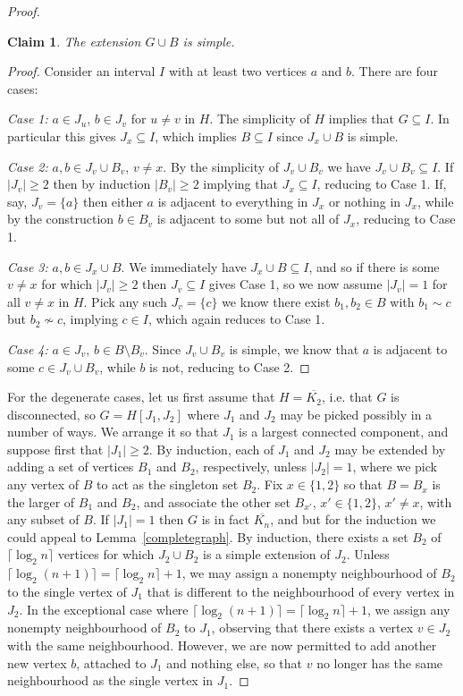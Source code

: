 \documentclass[11pt]{article}
\newtheorem*{claim}{Claim}
\begin{document}
\begin{proof}
\begin{claim}
The extension $G\cup B$ is simple.
\end{claim}

\begin{proof}
Consider an interval $I$ with at least two vertices $a$ and $b$. There are four cases:

\textit{Case 1:} $a\in J_u$, $b\in J_v$ for $u\neq v$ in $H$. The simplicity of $H$ implies that $G\subseteq I$. In particular this gives $J_x\subseteq I$, which implies $B\subseteq I$ since $J_x\cup B$ is simple.

\textit{Case 2:} $a,b \in J_v\cup B_v$, $v\neq x$. By the simplicity of $J_v\cup B_v$ we have $J_v \cup B_v\subseteq I$. If $|J_v|\geq 2$ then by induction $|B_v|\geq 2$ implying that $J_x\subseteq I$, reducing to Case 1. If, say, $J_v=\{a\}$ then either $a$ is adjacent to everything in $J_x$ or nothing in $J_x$, while by the construction $b\in B_v$ is adjacent to some but not all of $J_x$, reducing to Case 1.

\textit{Case 3:} $a,b\in J_x\cup B$. We immediately have $J_x\cup B \subseteq I$, and so if there is some $v\neq x$ for which $|J_v|\geq 2$ then $J_v\subseteq I$ gives Case 1, so we now assume $|J_v|=1$ for all $v\neq x$ in $H$. Pick any such $J_v=\{c\}$ we know there exist $b_1,b_2\in B$ with $b_1\sim c$ but $b_2\not\sim c$, implying $c\in I$, which again reduces to Case 1.

\textit{Case 4:} $a\in J_v$, $b\in B\setminus B_v$. Since $J_v\cup B_v$ is simple, we know that $a$ is adjacent to some $c\in J_v\cup B_v$, while $b$ is not, reducing to Case 2.
\end{proof}

For the degenerate cases, let us first assume that $H=\overline{K_2}$, i.e. that
$G$ is disconnected, so $G=H[J_1,J_2]$ where $J_1$ and $J_2$ may be picked possibly in a number of ways. We arrange it so that $J_1$ is a largest connected component, and suppose first that $|J_1|\geq 2$. By induction, each of $J_1$ and $J_2$ may be extended by adding a set of vertices $B_1$ and $B_2$, respectively, unless $|J_2|=1$, where we pick any vertex of $B$ to act as the singleton set $B_2$. Fix $x\in \{1,2\}$ so that $B=B_x$ is the larger of $B_1$ and $B_2$, and associate the other set $B_{x'}$, $x'\in\{1,2\}$, $x'\neq x$, with any subset of $B$. If $|J_1|=1$ then $G$ is in fact $\overline{K_n}$, and but for the induction we could appeal to Lemma~\ref{completegraph}. By induction, there exists a set $B_2$ of $\lceil\log_2 n\rceil$ vertices for which $J_2\cup B_2$ is a simple extension of $J_2$. Unless $\lceil\log_2 (n+1)\rceil = \lceil\log_2 n\rceil +1$, we may assign a nonempty neighbourhood of $B_2$ to the single vertex of $J_1$ that is different to the neighbourhood of every vertex in $J_2$. In the exceptional case where $\lceil\log_2 (n+1)\rceil = \lceil\log_2 n\rceil +1$, we assign any nonempty neighbourhood of $B_2$ to $J_1$, observing that there exists a vertex $v\in J_2$ with the same neighbourhood. However, we are now permitted to add another new vertex $b$, attached to $J_1$ and nothing else, so that $v$ no longer has the same neighbourhood as the single vertex in $J_1$.


\end{proof}
\end{document}
